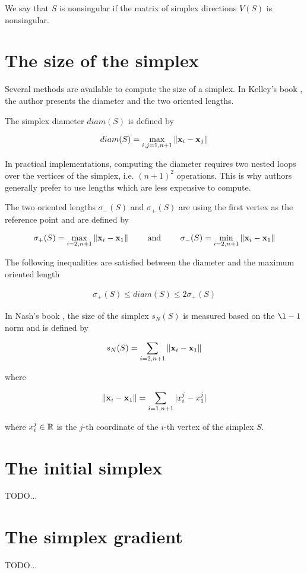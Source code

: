 We say that $S$ is nonsingular if the matrix of simplex directions $V(S)$ is nonsingular.


\section{The size of the simplex}

Several methods are available to compute the size of a simplex.
In Kelley's book \cite{Kelley1999}, the author presents the diameter and the two oriented lengths.

The simplex diameter $diam(S)$ is defined by 

\begin{eqnarray}
\label{simplex-diameter}
diam(S) = \max_{i,j=1,n+1} \|\mathbf{x}_i - \mathbf{x}_j\|
\end{eqnarray}

In practical implementations, computing the diameter requires two nested loops over the 
vertices of the simplex, i.e. $(n+1)^2$ operations. This is why authors generally 
prefer to use lengths which are less expensive to compute.

The two oriented lengths $\sigma_-(S)$ and $\sigma_+(S)$ are using the 
first vertex as the reference point and are defined by 

\begin{eqnarray}
\label{simplex-sigma}
\sigma_+(S) = \max_{i=2,n+1} \|\mathbf{x}_i - \mathbf{x}_1\| \qquad \textrm { and } \qquad \sigma_-(S) = \min_{i=2,n+1} \|\mathbf{x}_i - \mathbf{x}_1\|
\end{eqnarray}

The following inequalities are satisfied between the diameter and the maximum oriented length

\begin{eqnarray}
\label{simplex-sigma-diam}
\sigma_+(S) \leq diam(S) \leq 2 \sigma_+(S)
\end{eqnarray}

In Nash's book \cite{nla.cat-vn1060620}, the size of the simplex $s_N(S)$ is measured
based on the $\l-1$ norm and is defined by 

\begin{eqnarray}
\label{simplex-sizenash}
s_N(S) = \sum_{i=2,n+1} \|\mathbf{x}_i - \mathbf{x}_1\|
\end{eqnarray}

where 

\begin{eqnarray}
\label{simplex-sizenash2}
\|\mathbf{x}_i - \mathbf{x}_1\| = \sum_{i=1,n+1} |x_i^j - x_1^j|
\end{eqnarray}

where $x_i^j\in\mathbb{R}$ is the $j$-th coordinate of the $i$-th vertex of the simplex $S$.

\section{The initial simplex}

TODO...

\section{The simplex gradient}

TODO...

